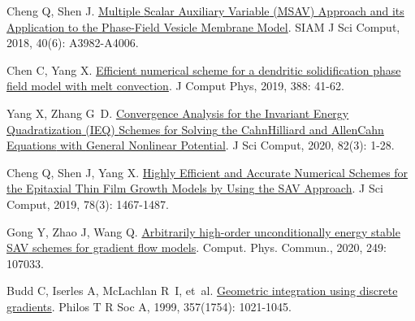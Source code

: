 \begin{thebibliography}{79}
    Cheng Q, Shen J.
    \newblock \href{https://epubs.siam.org/doi/10.1137/18M1166961}{Multiple {{Scalar Auxiliary Variable}} ({{MSAV}}) {{Approach}} and its {{Application}} to the {{Phase-Field Vesicle Membrane Model}}}\allowbreak[J].
    \newblock SIAM J Sci Comput, 2018, 40\allowbreak (6): A3982-A4006.
    
    Chen C, Yang X.
    \newblock \href{https://www.sciencedirect.com/science/article/pii/S0021999119302001}{Efficient numerical scheme for a dendritic solidification phase field model with melt convection}\allowbreak[J].
    \newblock J Comput Phys, 2019, 388: 41-62.
    
    Yang X, Zhang G~D.
    \newblock \href{https://doi.org/10.1007/s10915-020-01151-x}{Convergence {{Analysis}} for the {{Invariant Energy Quadratization}} ({{IEQ}}) {{Schemes}} for {{Solving}} the {{Cahn}}{\textendash}{{Hilliard}} and {{Allen}}{\textendash}{{Cahn Equations}} with {{General Nonlinear Potential}}}\allowbreak[J].
    \newblock J Sci Comput, 2020, 82\allowbreak (3): 1-28.
    
    Cheng Q, Shen J, Yang X.
    \newblock \href{https://doi.org/10.1007/s10915-018-0832-5}{Highly {{Efficient}} and {{Accurate Numerical Schemes}} for the {{Epitaxial Thin Film Growth Models}} by {{Using}} the {{SAV Approach}}}\allowbreak[J].
    \newblock J Sci Comput, 2019, 78\allowbreak (3): 1467-1487.
    
    Gong Y, Zhao J, Wang Q.
    \newblock \href{https://www.sciencedirect.com/science/article/pii/S0010465519303716}{Arbitrarily high-order unconditionally energy stable {{SAV}} schemes for gradient flow models}\allowbreak[J].
    \newblock Comput. Phys. Commun., 2020, 249: 107033.
    
    Budd C, Iserles A, McLachlan R~I, et~al.
    \newblock \href{https://royalsocietypublishing.org/doi/10.1098/rsta.1999.0363}{Geometric integration using discrete gradients}\allowbreak[J].
    \newblock Philos T R Soc A, 1999, 357\allowbreak (1754): 1021-1045.


\end{thebibliography}
